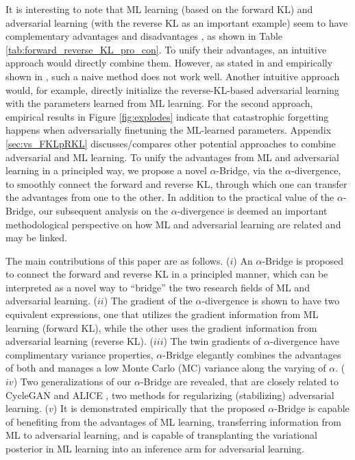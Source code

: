 \documentclass[letterpaper]{article} %
\begin{document}
It is interesting to note that ML learning (based on the forward KL) and adversarial learning (with the reverse KL as an important example) seem to have complementary advantages and disadvantages \cite{nguyen2017dual}, as shown in Table \ref{tab:forward_reverse_KL_pro_con}.
To unify their advantages, an intuitive approach would directly combine them. However, as stated in \cite{larsen2015autoencoding,mathieu2016disentangling} and empirically shown in \cite{zhang2019training}, such a naive method does not work well.
Another intuitive approach would, for example, directly initialize the reverse-KL-based adversarial learning with the parameters learned from ML learning.
For the second approach, empirical results in Figure \ref{fig:explodes} indicate that catastrophic forgetting \cite{kirkpatrick2017overcoming,liang2018generative} happens when adversarially finetuning the ML-learned parameters.
Appendix \ref{sec:vs_FKLpRKL}
discusses/compares other potential approaches to combine adversarial and ML learning.
To unify the advantages from ML and adversarial learning in a principled way, we propose a novel $\alpha$-Bridge, via the $\alpha$-divergence, to smoothly connect the forward and reverse KL, through which one can transfer the advantages from one to the other.
In addition to the practical value of the $\alpha$-Bridge, our subsequent analysis on the $\alpha$-divergence is deemed an important methodological perspective on how ML and adversarial learning are related and may be linked.


The main contributions of this paper are as follows.
($i$) An $\alpha$-Bridge is proposed to connect the forward and reverse KL in a principled manner, which can be interpreted as a novel way to ``bridge'' the two research fields of ML and adversarial learning.
($ii$) The gradient of the $\alpha$-divergence is shown to have two equivalent expressions, one that utilizes the gradient information from ML learning (forward KL), while the other uses the gradient information from adversarial learning (reverse KL).
($iii$) The twin gradients of $\alpha$-divergence have complimentary variance properties, $\alpha$-Bridge elegantly combines the advantages of both and manages a low Monte Carlo (MC) variance along the varying of $\alpha$.
($iv$) Two generalizations of our $\alpha$-Bridge are revealed, that are closely related to CycleGAN \cite{zhu2017unpaired} and ALICE \cite{li2017alice}, two methods for regularizing (stabilizing) adversarial learning.
($v$) It is demonstrated empirically that the proposed $\alpha$-Bridge is capable of benefiting from the advantages of ML learning,
transferring information from ML to adversarial learning, and is capable of transplanting the variational posterior in ML learning into an inference arm for adversarial learning.
\end{document}

